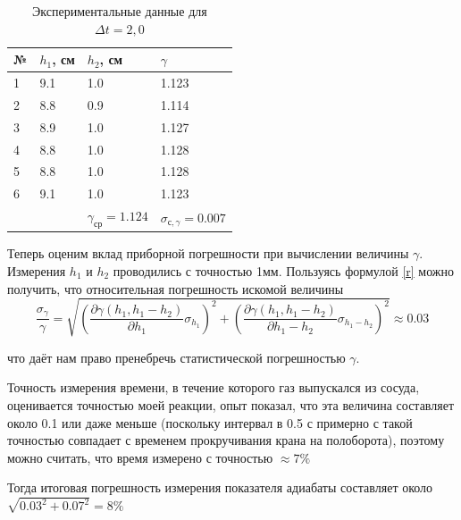 \documentclass[a4paper,12pt]{article}
\begin{document}
\begin{table}[h!] 
	\caption{Экспериментальные данные для $\Delta t = 2,0$}
	\begin{center}
		\begin{tabular}{|*{4}{l|}}
			\hline
			№ & $h_1$, см & $h_2$, см & $\gamma$ \\ \hline
			1 & 9.1 & 1.0 & 1.123 \\ \hline 
			2 & 8.8 & 0.9 & 1.114 \\ \hline
			3 & 8.9 & 1.0 & 1.127 \\ \hline 
			4 & 8.8 & 1.0 & 1.128 \\ \hline
			5 & 8.8 & 1.0 & 1.128 \\ \hline
			6 & 9.1 & 1.0 & 1.123 \\ \hline 
			& & $\gamma_{ср} = 1.124 $ & $\sigma_{с, \gamma} = 0.007$ \\ \hline			
		\end{tabular}
	\end{center}
\end{table}


Теперь оценим вклад приборной погрешности при вычислении величины $\gamma$. Измерения $h_1$  и $h_2$ проводились с точностью 1мм. Пользуясь формулой \eqref{r} можно получить, что относительная погрешность искомой величины $$\dfrac{\sigma_\gamma}{\gamma} = \sqrt{\left(\dfrac{\partial\gamma(h_1, h_1 - h_2)}{\partial h_1}\sigma_{h_1}\right)^2 + {\left(\dfrac{\partial\gamma(h_1, h_1 - h_2)}{\partial h_1 - h_2}\sigma_{h_1 - h_2}\right)^2} }\approx 0.03$$

что даёт нам право пренебречь статистической погрешностью $\gamma$.


Точность измерения времени, в течение которого газ выпускался из сосуда, оценивается точностью моей реакции, опыт показал, что эта величина составляет около 0.1 или даже меньше (поскольку интервал в 0.5 с примерно с такой точностью совпадает с временем прокручивания крана на полоборота), поэтому можно считать, что время измерено с точностью $\approx 7\%$

Тогда итоговая погрешность измерения показателя адиабаты составляет около $\sqrt{0.03^2+0.07^2} = 8\%$
\end{document}
